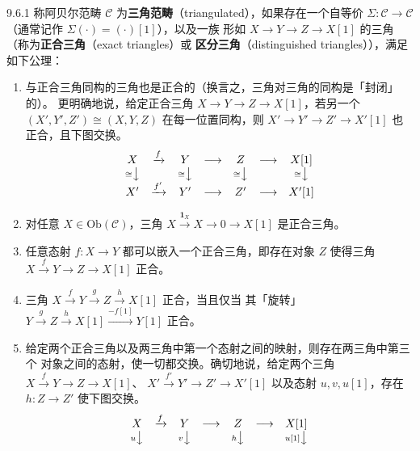 \begin{wdefn}{9.6.1}
称阿贝尔范畴 $\mathcal C$ 为\textbf{三角范畴}（triangulated），如果存在一个自等价
$\Sigma:\mathcal C\to\mathcal C$（通常记作 $\Sigma(\cdot)=(\cdot)[1]$），以及一族
形如 $X\to Y\to Z\to X[1]$ 的三角（称为\textbf{正合三角}（exact triangles）或
\textbf{区分三角}（distinguished triangles）），满足如下公理：
\begin{enumerate}[label=(\roman*)]
  \item 与正合三角同构的三角也是正合的（换言之，三角对三角的同构是「封闭」的）。
        更明确地说，给定正合三角 $X\to Y\to Z\to X[1]$，若另一个
        $(X',Y',Z')\cong(X,Y,Z)$ 在每一位置同构，则 $X'\to Y'\to Z'\to X'[1]$
        也正合，且下图交换。
        \[
        \begin{array}{ccccccc}
        X & \xrightarrow{f} & Y & \longrightarrow & Z & \longrightarrow & X[1]\\
        {\scriptstyle\cong}\big\downarrow & &
        {\scriptstyle\cong}\big\downarrow & &
        {\scriptstyle\cong}\big\downarrow & &
        {\scriptstyle\cong}\big\downarrow\\
        X' & \xrightarrow{f'} & Y' & \longrightarrow & Z' & \longrightarrow & X'[1]
        \end{array}
        \]
  \item 对任意 $X\in\mathrm{Ob}(\mathcal C)$，三角
        $X\xrightarrow{\mathbf 1_X}X\to0\to X[1]$ 是正合三角。
  \item 任意态射 $f:X\to Y$ 都可以嵌入一个正合三角，即存在对象 $Z$ 使得三角
        $X\xrightarrow{f}Y\to Z\to X[1]$ 正合。
  \item 三角 $X\xrightarrow{f}Y\xrightarrow{g}Z\xrightarrow{h}X[1]$ 正合，当且仅当
        其「旋转」
        $Y\xrightarrow{g}Z\xrightarrow{h}X[1]\xrightarrow{-f[1]}Y[1]$ 正合。
  \item 给定两个正合三角以及两三角中第一个态射之间的映射，则存在两三角中第三个
        对象之间的态射，使一切都交换。确切地说，给定两个三角
        $X\xrightarrow{f}Y\to Z\to X[1]$、
        $X'\xrightarrow{f'}Y'\to Z'\to X'[1]$ 以及态射 $u,v,u[1]$，存在
        $h:Z\to Z'$ 使下图交换。
        \[
        \begin{array}{ccccccc}
        X & \xrightarrow{f} & Y & \longrightarrow & Z & \longrightarrow & X[1]\\
        {\scriptstyle u}\big\downarrow & &
        {\scriptstyle v}\big\downarrow & &
        {\scriptstyle h}\big\downarrow & &
        {\scriptstyle u[1]}\big\downarrow\\

\end{array}\]
\end{enumerate}
\end{wdefn}
